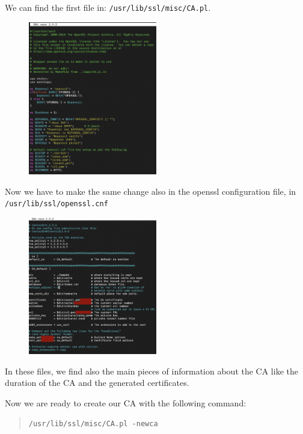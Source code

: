 \documentclass[11pt]{article}
\begin{document}
\newpage
We can find the first file in: \texttt{/usr/lib/ssl/misc/CA.pl}.

\begin{figure}[!ht]
 \centering
 \includegraphics[width=0.5\textwidth]{pic1-hw6-7-1635747.png}
 \label{fig:capl}
\end{figure}

Now we have to make the same change also in the openssl configuration file, in \texttt{/usr/lib/ssl/openssl.cnf}

\begin{figure}[!ht]
 \centering
 \includegraphics[width=0.5\textwidth]{pic2-hw6-7-1635747.png}
 \label{fig:conf}
\end{figure}

In these files, we find also the main pieces of information about the CA like the duration of the CA and the generated certificates.

\newpage
Now we are ready to create our CA with the following command:

\begin{quote}
 \texttt{/usr/lib/ssl/misc/CA.pl -newca}
\end{quote}
\end{document}
